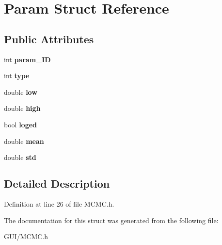 \hypertarget{struct_param}{}\section{Param Struct Reference}
\label{struct_param}
\subsection*{Public Attributes}
\begin{DoxyCompactItemize}
\item 
\mbox{\label{struct_param_ad5961716f06b01baa058c6f48a79f749}} 
int {\bfseries param\+\_\+\+ID}
\item 
\mbox{\label{struct_param_a7f7569bbf0acf8464807758ca9f43fb5}} 
int {\bfseries type}
\item 
\mbox{\label{struct_param_ae50bd0586a30bb65f7cee49300ad9bb8}} 
double {\bfseries low}
\item 
\mbox{\label{struct_param_a62b827f85e668ccfc873f0292041a9f5}} 
double {\bfseries high}
\item 
\mbox{\label{struct_param_ae8336c14ddbc6074f03e6e27774794ef}} 
bool {\bfseries loged}
\item 
\mbox{\label{struct_param_a1edadf529bb1ed8c05cdbd18b02557a3}} 
double {\bfseries mean}
\item 
\mbox{\label{struct_param_aa3bb4b0b558b550aad6aa78eb192bef7}} 
double {\bfseries std}
\end{DoxyCompactItemize}


\subsection{Detailed Description}


Definition at line 26 of file M\+C\+M\+C.\+h.



The documentation for this struct was generated from the following file\+:\begin{DoxyCompactItemize}
\item 
G\+U\+I/M\+C\+M\+C.\+h\end{DoxyCompactItemize}
